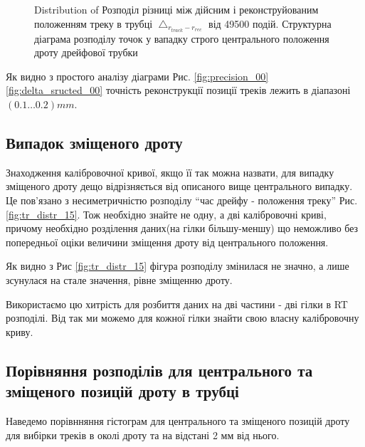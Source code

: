 \documentclass[]{article}
\begin{document}
	\begin{figure}[h]
	\centering
		\qquad
		\caption{Distribution of Розподіл різниці між дійсним і реконструйованим положенням треку в трубці $\bigtriangleup_{r_{track} - r_{rec}}$ від 49500 подій. Структурна діаграма розподілу точок у вападку строго центрального положення дроту дрейфової трубки}
	\end{figure}
	
	Як видно з простого аналізу діаграми Рис. \ref{fig:precision_00} \ref{fig:delta_sructed_00} точність реконструкції позиції треків лежить в діапазоні $(0.1 \dots 0.2) mm$. 
	
	\subsection{Випадок зміщеного дроту}
	Знаходження калібровочної кривої, якщо її так можна назвати, для випадку зміщеного дроту дещо відрізняється від описаного вище центрального випадку. Це пов’язано з несиметричністю розподілу ``час дрейфу - положення треку'' Рис. \ref{fig:tr_distr_15}. Тож необхідно знайте не одну, а дві калібровочні криві, причому необхідно розділення даних(на гілки більшу-меншу) що неможливо без попередньої оціки величини зміщення дроту від центрального положення.
	

	
	Як видно з Рис \ref{fig:tr_distr_15} фігура розподілу змінилася не значно, а лише зсунулася на стале значення, рівне зміщенню дроту.
	
	Використаємо цю хитрість для розбиття даних на дві частини - дві гілки в RT розподілі. Від так ми можемо для  кожної гілки знайти свою власну калібровочну криву.
	
	\subsection{ Порівняння розподілів для центрального та зміщеного позицій дроту в трубці}	
	Наведемо порівнняння гістограм для центрального та зміщеного позицій дроту для вибірки треків в околі дроту та на відстані 2 мм від нього.
	
\end{document}
